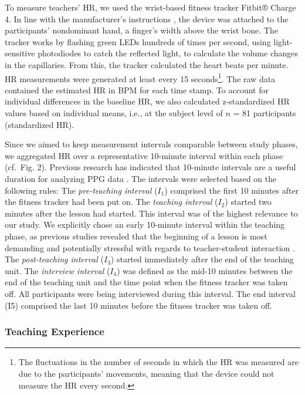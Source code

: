\documentclass[preprint, 3p,
sort,]{elsarticle} %
\begin{document}
To measure teachers' HR, we used the wrist-based fitness tracker Fitbit®
Charge 4. In line with the manufacturer's instructions \citep{fitbitnd},
the device was attached to the participants' nondominant hand, a
finger's width above the wrist bone. The tracker works by flashing green
LEDs hundreds of times per second, using light-sensitive photodiodes to
catch the reflected light, to calculate the volume changes in the
capillaries. From this, the tracker calculated the heart beats per
minute. HR measurements were generated at least every 15
seconds\footnote{The fluctuations in the number of seconds in which the
  HR was measured are due to the participants' movements, meaning that
  the device could not measure the HR every second.}. The raw data
contained the estimated HR in BPM for each time stamp. To account for
individual differences in the baseline HR, we also calculated
z-standardized HR values based on individual means, i.e., at the subject
level of \(n\) = 81 participants (standardized HR).

Since we aimed to keep measurement intervals comparable between study
phases, we aggregated HR over a representative 10-minute interval within
each phase (cf.~Fig. 2). Previous research has indicated that 10-minute
intervals are a useful duration for analyzing PPG data
\citep{lu2008can}. The intervals were selected based on the following
rules: The \emph{pre-teaching interval} (\(I_1\)) comprised the first 10
minutes after the fitness tracker had been put on. The \emph{teaching
interval} (\(I_2\)) started two minutes after the lesson had started.
This interval was of the highest relevance to our study. We explicitly
chose an early 10-minute interval within the teaching phase, as previous
studies revealed that the beginning of a lesson is most demanding and
potentially stressful with regards to teacher-student interaction
\citep{donker2018, claessens2017positive}. The \emph{post-teaching
interval} (\(I_3\)) started immediately after the end of the teaching
unit. The \emph{interview interval} (\(I_4\)) was defined as the mid-10
minutes between the end of the teaching unit and the time point when the
fitness tracker was taken off. All participants were being interviewed
during this interval. The end interval (I5) comprised the last 10
minutes before the fitness tracker was taken off.

\subsubsection{Teaching Experience}\label{teaching-experience}
\end{document}
